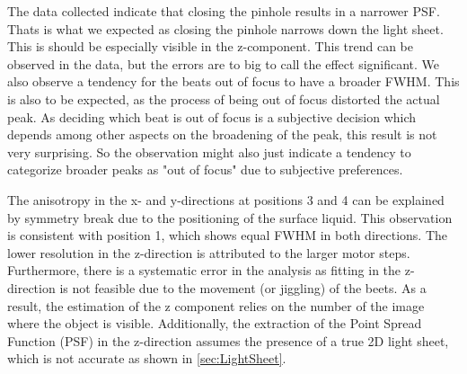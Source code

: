 The data collected indicate that closing the pinhole results in a narrower PSF. Thats is what we expected as closing the pinhole narrows down the light sheet. This 
is should be especially visible in the z-component. This trend can be observed in the data, but the errors are to big to call the effect significant. 
We also observe a tendency for the beats out of focus to have a broader FWHM. This is also to be expected, as the 
process of being out of focus distorted the actual peak. As deciding which beat is out of focus is a 
subjective decision which depends among other aspects on the broadening of the peak, this result is not very surprising.
So the observation might also just indicate a tendency to categorize broader peaks as "out of focus" due to subjective preferences.

The anisotropy in the x- and y-directions at positions 3 and 4 can be explained by symmetry break due to the positioning of the surface liquid. This observation is consistent with position 1, which shows equal FWHM in both directions. The lower resolution in the z-direction is attributed to the larger motor steps. Furthermore, there is a systematic error in the analysis as fitting in the z-direction is not feasible due to the movement (or jiggling) of the beets. As a result, the estimation of the z component relies on the number of the image where the object is visible. Additionally, the extraction of the Point Spread Function (PSF) in the z-direction assumes the presence of a true 2D light sheet, which is not accurate as shown in \cref{sec:LightSheet}.